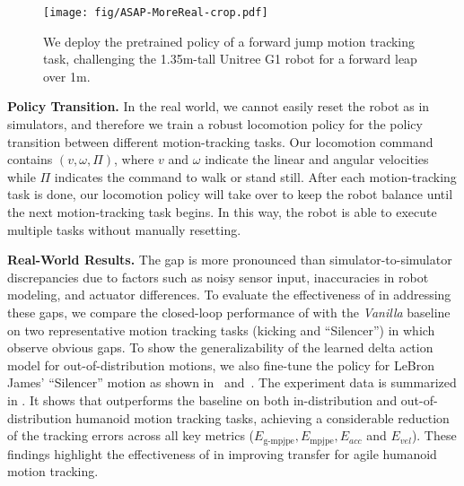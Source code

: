 \begin{figure}[t]
    \centering
    \texttt{[image: fig/ASAP-MoreReal-crop.pdf]}
     \vspace{-3mm}
    \caption{We deploy the pretrained policy of a forward jump motion tracking task, challenging the 1.35m-tall Unitree G1 robot for a forward leap over 1m.}
    \label{fig:data-collect}
    \vspace{-4mm}
\end{figure}

\textbf{Policy Transition.}
In the real world, we cannot easily reset the robot as in simulators, and therefore we train a robust locomotion policy for the policy transition between different motion-tracking tasks. Our locomotion command contains $(v, \omega, \Pi)$, where $v$ and $\omega$ indicate the linear and angular velocities while $\Pi$ indicates the command to walk or stand still. After each motion-tracking task is done, our locomotion policy will take over to keep the robot balance until the next motion-tracking task begins. In this way, the robot is able to execute multiple tasks without manually resetting. 


\textbf{Real-World Results.}
The \simtoreal gap is more pronounced than simulator-to-simulator discrepancies due to factors such as noisy sensor input, inaccuracies in robot modeling, and actuator differences.
To evaluate the effectiveness of \method in addressing these gaps, we compare the closed-loop performance of \method with the \textit{Vanilla} baseline on two representative motion tracking tasks  (kicking and ``Silencer'') in which observe obvious \simtoreal gaps. 
To show the generalizability of the learned delta action model for out-of-distribution motions, we also fine-tune the policy for LeBron James’ ``Silencer'' motion as shown in~ and~. The experiment data is summarized in . It shows that \method outperforms the baseline on both in-distribution and out-of-distribution humanoid motion tracking tasks, achieving a considerable reduction of the tracking errors across all key metrics ($E_\text{g-mpjpe}, E_\text{mpjpe}, E_{acc}$ and $E_{vel}$). These findings highlight the effectiveness of \method in improving \simtoreal transfer for agile humanoid motion tracking.

